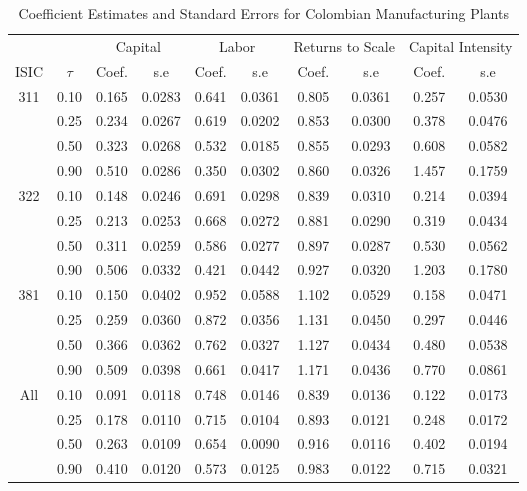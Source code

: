 \documentclass[11pt]{article}
\begin{document}
\begin{table}[H]
\centering
\caption{Coefficient Estimates and Standard Errors for Colombian Manufacturing Plants}
\begin{tabular}{cccccccccc}
  \hline\hline & & \multicolumn{2}{c}{Capital}  & \multicolumn{2}{c}{Labor} & \multicolumn{2}{c}{Returns to Scale} & \multicolumn{2}{c}{Capital Intensity}\\ \cmidrule(lr){3-4} \cmidrule(lr){5-6} \cmidrule(lr){7-8} \cmidrule(lr){9-10}ISIC & $\tau$ & Coef. & s.e & Coef. & s.e & Coef. & s.e & Coef. & s.e \\ 
  \hline
311 & 0.10 & 0.165 & 0.0283 & 0.641 & 0.0361 & 0.805 & 0.0361 & 0.257 & 0.0530 \\ 
   & 0.25 & 0.234 & 0.0267 & 0.619 & 0.0202 & 0.853 & 0.0300 & 0.378 & 0.0476 \\ 
   & 0.50 & 0.323 & 0.0268 & 0.532 & 0.0185 & 0.855 & 0.0293 & 0.608 & 0.0582 \\ 
   & 0.90 & 0.510 & 0.0286 & 0.350 & 0.0302 & 0.860 & 0.0326 & 1.457 & 0.1759 \\ 
  322 & 0.10 & 0.148 & 0.0246 & 0.691 & 0.0298 & 0.839 & 0.0310 & 0.214 & 0.0394 \\ 
   & 0.25 & 0.213 & 0.0253 & 0.668 & 0.0272 & 0.881 & 0.0290 & 0.319 & 0.0434 \\ 
   & 0.50 & 0.311 & 0.0259 & 0.586 & 0.0277 & 0.897 & 0.0287 & 0.530 & 0.0562 \\ 
   & 0.90 & 0.506 & 0.0332 & 0.421 & 0.0442 & 0.927 & 0.0320 & 1.203 & 0.1780 \\ 
  381 & 0.10 & 0.150 & 0.0402 & 0.952 & 0.0588 & 1.102 & 0.0529 & 0.158 & 0.0471 \\ 
   & 0.25 & 0.259 & 0.0360 & 0.872 & 0.0356 & 1.131 & 0.0450 & 0.297 & 0.0446 \\ 
   & 0.50 & 0.366 & 0.0362 & 0.762 & 0.0327 & 1.127 & 0.0434 & 0.480 & 0.0538 \\ 
   & 0.90 & 0.509 & 0.0398 & 0.661 & 0.0417 & 1.171 & 0.0436 & 0.770 & 0.0861 \\ 
  All & 0.10 & 0.091 & 0.0118 & 0.748 & 0.0146 & 0.839 & 0.0136 & 0.122 & 0.0173 \\ 
   & 0.25 & 0.178 & 0.0110 & 0.715 & 0.0104 & 0.893 & 0.0121 & 0.248 & 0.0172 \\ 
   & 0.50 & 0.263 & 0.0109 & 0.654 & 0.0090 & 0.916 & 0.0116 & 0.402 & 0.0194 \\ 
   & 0.90 & 0.410 & 0.0120 & 0.573 & 0.0125 & 0.983 & 0.0122 & 0.715 & 0.0321 \\ 
   \hline
\end{tabular}
\label{COLestLP}
\end{table}
\end{document}
